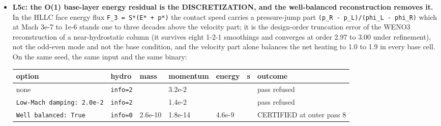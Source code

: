 \documentclass[english,a4paper]{my_memo}
\begin{document}
\begin{itemize}
  the base layer (continuity floor 8.43e-10 against the anchored tolerance
  8.43e-9, energy 4.56e-9 against 1e-6, momentum 1.9e-14 against 1e-8, no
  unresolved cell), admissible only through the anchored mass rule, the fixed
  3e-12 standing 281x below the floor of cell 1. The stationary base velocity
  is 0.0297 cm/s, Mach 2.7e-7, 1.8e4 times below the archived seed\textquotesingle s -538
  cm/s, so L1\textquotesingle s "7e5 times the heating" is the seed\textquotesingle s velocity and not the
  layer\textquotesingle s. The obstruction is the clock: the base cell\textquotesingle s thermal time is
  4.8e7 CFL steps and the transit to 1.15 R\_p 1.8e8, against the 1e4 to 3e4
  steps any march ran, and the update map is linear in dt with no floor, so
  the march\textquotesingle s fixed point IS the root. LHS 1140 b is harder than the hot
  Uranus because the 1 microbar level is already the top of the absorbing
  column: heating peaks in cell 1 and cooling is 0.46 percent of it, against
  325 percent on the hot Uranus, so every erg leaves as enthalpy flux at Mach
  2.7e-7.
\item
  \textbf{L5c: the O(1) base-layer energy residual is the DISCRETIZATION, and the
  well-balanced reconstruction removes it.} In the HLLC face energy flux
  \texttt{F\_3\ =\ S*(E*\ +\ p*)} the contact speed carries a pressure-jump part
  \texttt{(p\_R\ -\ p\_L)/(phi\_L\ -\ phi\_R)} which at Mach 3e-7 to 1e-6 stands one to
  three decades above the velocity part; it is the design-order truncation
  error of the WENO3 reconstruction of a near-hydrostatic column (it survives
  eight 1-2-1 smoothings and converges at order 2.97 to 3.00 under
  refinement), not the odd-even mode and not the base condition, and the
  velocity part alone balances the net heating to 1.0 to 1.9 in every base
  cell. On the same seed, the same input and the same binary:

  {\def\LTcaptype{none} %
  {\small
\begin{longtable}[]{@{}>{\raggedright\arraybackslash}p{\dimexpr(\linewidth-14\tabcolsep)/7\relax}>{\raggedright\arraybackslash}p{\dimexpr(\linewidth-14\tabcolsep)/7\relax}>{\raggedright\arraybackslash}p{\dimexpr(\linewidth-14\tabcolsep)/7\relax}>{\raggedright\arraybackslash}p{\dimexpr(\linewidth-14\tabcolsep)/7\relax}>{\raggedright\arraybackslash}p{\dimexpr(\linewidth-14\tabcolsep)/7\relax}>{\raggedright\arraybackslash}p{\dimexpr(\linewidth-14\tabcolsep)/7\relax}>{\raggedright\arraybackslash}p{\dimexpr(\linewidth-14\tabcolsep)/7\relax}@{}}
  \toprule\noalign{}
  option & hydro & mass & momentum & energy & s & outcome \\
  \midrule\noalign{}
  \endhead
  \bottomrule\noalign{}
  \endlastfoot
  none & \texttt{info=2} & 1.08 & 3.2e-2 & 0.63 & 1325 & pass refused \\
  \texttt{Low-Mach\ damping:\ 2.0e-2} & \texttt{info=2} & 1.32 & 1.4e-2 & 1.24 & 1232 & pass refused \\
  \texttt{Well\ balanced:\ True} & \texttt{info=0} & 2.6e-10 & 1.8e-14 & 4.6e-9 & 85 & CERTIFIED at outer pass 8 \\
  \end{longtable}
}
  }


\end{itemize}
\end{document}
